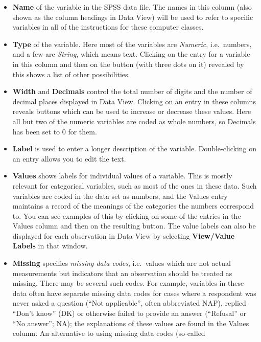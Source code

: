 \documentclass[11pt,a4paper,openany]{book}
\begin{document}
\begin{enumerate}
  \begin{itemize}
  \item
    \textbf{Name} of the variable in the SPSS data file. The names in
    this column (also shown as the column headings in Data View) will be
    used to refer to specific variables in all of the instructions for
    these computer classes.
  \item
    \textbf{Type} of the variable. Here most of the variables are
    \emph{Numeric}, i.e.~numbers, and a few are \emph{String}, which
    means text. Clicking on the entry for a variable in this column and
    then on the button (with three dots on it) revealed by this shows a
    list of other possibilities.
  \item
    \textbf{Width} and \textbf{Decimals} control the total number of
    digits and the number of decimal places displayed in Data View.
    Clicking on an entry in these columns reveals buttons which can be
    used to increase or decrease these values. Here all but two of the
    numeric variables are coded as whole numbers, so Decimals has been
    set to 0 for them.
  \item
    \textbf{Label} is used to enter a longer description of the
    variable. Double-clicking on an entry allows you to edit the text.
  \item
    \textbf{Values} shows labels for individual values of a variable.
    This is mostly relevant for categorical variables, such as most of
    the ones in these data. Such variables are coded in the data set as
    numbers, and the Values entry maintains a record of the meanings of
    the categories the numbers correspond to. You can see examples of
    this by clicking on some of the entries in the Values column and
    then on the resulting button. The value labels can also be displayed
    for each observation in Data View by selecting \textbf{View/Value
    Labels} in that window.
  \item
    \textbf{Missing} specifies \emph{missing data codes}, i.e.~values
    which are not actual measurements but indicators that an observation
    should be treated as missing. There may be several such codes. For
    example, variables in these data often have separate missing data
    codes for cases where a respondent was never asked a question (``Not
    applicable'', often abbreviated NAP), replied ``Don't know'' (DK) or
    otherwise failed to provide an answer (``Refusal'' or ``No answer'';
    NA); the explanations of these values are found in the Values
    column. An alternative to using missing data codes (so-called

\end{itemize}
\end{enumerate}
\end{document}
